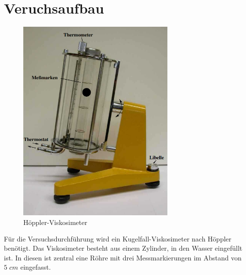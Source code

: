 \section{Veruchsaufbau}
\label{sec:Veruchsaufbau}

\begin{figure}[htbp]
    \centering
    \includegraphics[width=0.7\textwidth]{bilder/hoeppler_viskosimeter.png}
    \caption{Höppler-Viskosimeter}
    \label{fig:hoeppler}
\end{figure}

Für die Versuchsdurchführung wird ein Kugelfall-Viskosimeter nach Höppler benötigt. Das Viskosimeter besteht aus einem Zylinder, in den Wasser eingefüllt ist. 
In diesen ist zentral eine Röhre mit drei Messmarkierungen im Abstand von $5\;\unit{cm}$ eingefasst. 